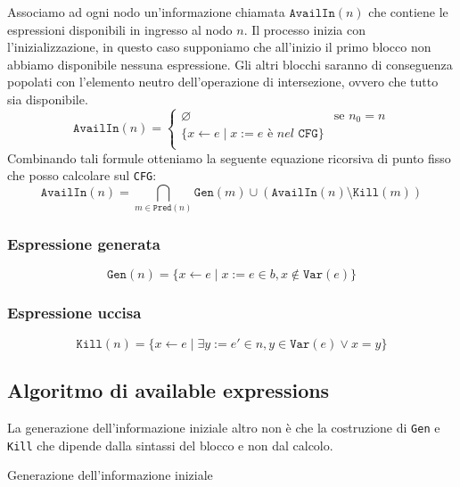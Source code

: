Associamo ad ogni nodo un'informazione chiamata $\texttt{AvailIn}(n)$ che contiene le espressioni 
disponibili in ingresso al nodo $n$.
Il processo inizia con l'inizializzazione, in questo caso supponiamo che all'inizio il primo 
blocco non abbiamo disponibile nessuna espressione. Gli altri blocchi saranno di conseguenza popolati 
con l'elemento neutro dell'operazione di intersezione, ovvero che tutto sia disponibile.
\begin{equation}
    \texttt{AvailIn}(n) =
    \begin{cases}
        \varnothing & \text{se } n_0 = n\\
        \{x \gets e \mid x:=e \textit{ è nel }\texttt{CFG}\}\\
    \end{cases}
\end{equation}
Combinando tali formule otteniamo la seguente equazione ricorsiva di punto fisso che posso calcolare sul \texttt{CFG}:
\begin{equation}
    \texttt{AvailIn}(n) = \bigcap_{m \in \texttt{Pred}(n)} \texttt{Gen}(m) 
    \cup (\texttt{AvailIn}(n) \setminus \texttt{Kill}(m))
    \label{eq:availableexpressions}
\end{equation}
\subsubsection{Espressione generata}
\begin{equation}
    \texttt{Gen}(n) = \{x \gets e \mid x:=e \in b, x \notin \texttt{Var}(e)\}
\end{equation}
\subsubsection{Espressione uccisa}
\begin{equation}
    \texttt{Kill}(n) = \{x \gets e \mid \exists y := e' \in n , y \in \texttt{Var}(e) \vee x = y\}
\end{equation}
\subsection{Algoritmo di available expressions}
La generazione dell'informazione iniziale altro non è che la costruzione di \texttt{Gen} e \texttt{Kill}
che dipende dalla sintassi del blocco e non dal calcolo.

\begin{algorithm}[H]
    \DontPrintSemicolon
    \caption{Generazione dell'informazione iniziale}
    \label{alg:init}

\end{algorithm}

